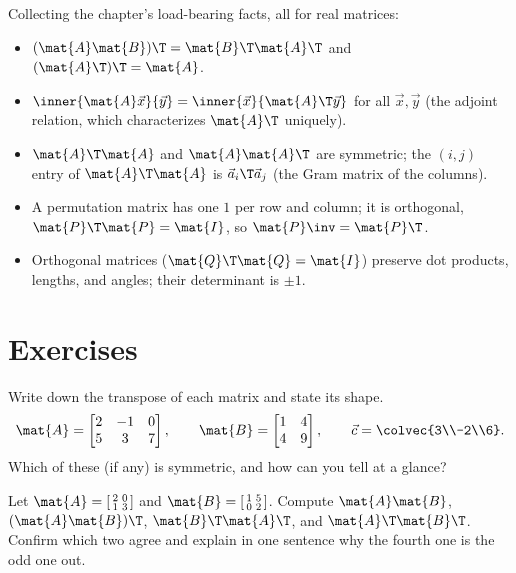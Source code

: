 \begin{formalbox}
Collecting the chapter's load-bearing facts, all for real matrices:
\begin{itemize}
  \item $(\mat{A}\mat{B})\T=\mat{B}\T\mat{A}\T$ and $(\mat{A}\T)\T=\mat{A}$.
  \item $\inner{\mat{A}\vec{x}}{\vec{y}}=\inner{\vec{x}}{\mat{A}\T\vec{y}}$ for all $\vec{x},\vec{y}$
        (the adjoint relation, which characterizes $\mat{A}\T$ uniquely).
  \item $\mat{A}\T\mat{A}$ and $\mat{A}\mat{A}\T$ are symmetric; the $(i,j)$ entry of $\mat{A}\T\mat{A}$
        is $\vec{a}_i\T\vec{a}_j$ (the Gram matrix of the columns).
  \item A permutation matrix has one $1$ per row and column; it is orthogonal,
        $\mat{P}\T\mat{P}=\mat{I}$, so $\mat{P}\inv=\mat{P}\T$.
  \item Orthogonal matrices ($\mat{Q}\T\mat{Q}=\mat{I}$) preserve dot products, lengths, and angles;
        their determinant is $\pm 1$.
\end{itemize}
\end{formalbox}

\section{Exercises}

\begin{exercise}\label{ch10:ex-warmup}
Write down the transpose of each matrix and state its shape.
\[
  \mat{A}=\begin{bmatrix} 2 & -1 & 0 \\ 5 & 3 & 7 \end{bmatrix},\qquad
  \mat{B}=\begin{bmatrix} 1 & 4 \\ 4 & 9 \end{bmatrix},\qquad
  \vec{c}=\colvec{3\\-2\\6}.
\]
Which of these (if any) is symmetric, and how can you tell at a glance?
\end{exercise}

\begin{exercise}\label{ch10:ex-reversal}
Let $\mat{A}=\left[\begin{smallmatrix}2&0\\1&3\end{smallmatrix}\right]$ and
$\mat{B}=\left[\begin{smallmatrix}1&5\\0&2\end{smallmatrix}\right]$. Compute $\mat{A}\mat{B}$,
$(\mat{A}\mat{B})\T$, $\mat{B}\T\mat{A}\T$, and $\mat{A}\T\mat{B}\T$. Confirm which two agree and
explain in one sentence why the fourth one is the odd one out.
\end{exercise}

